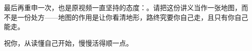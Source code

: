\vspace{1em}

最后再重申一次，也是原视频一直坚持的态度：。请把这份讲义当作一张地图，而不是一份处方——地图的作用是让你看清地形，路终究要你自己走，且只有你自己能走。

祝你，从读懂自己开始，慢慢活得顺一点。
